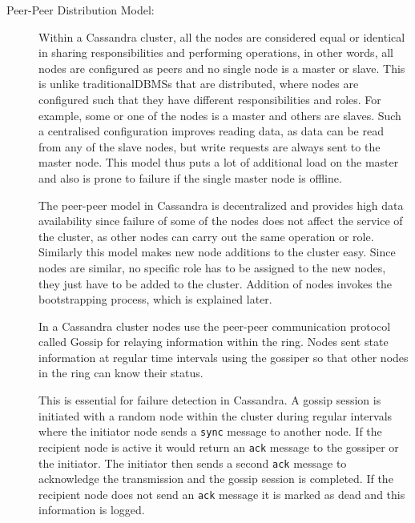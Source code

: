 \begin{description}
\item[Peer-Peer Distribution Model:] Within a Cassandra cluster, all the nodes
are considered equal or identical in sharing responsibilities and
performing operations, in other words, all nodes are configured as peers and no
single node is a master or slave.  This is unlike traditional\acp{DBMS} that
are distributed, where nodes are configured such that they have different
responsibilities and roles. For example, some or one of the nodes is a master
and others are slaves.
Such a centralised configuration improves reading data, as data can be read from
any of the slave nodes, but write requests are always sent to the master node.
This model thus puts a lot of additional load on the master and also is prone to
failure if the single master node is offline.

The peer-peer model in Cassandra is decentralized and  provides high data
availability since failure of some of the nodes does not affect the service of
the cluster, as other nodes can carry out the same operation or role. Similarly
this model makes new node additions to the cluster easy. Since nodes are
similar, no specific role has to be assigned to the new nodes, they just have to
be added to the cluster. Addition of nodes invokes the bootstrapping process,
which is explained later.

In a Cassandra cluster nodes use the peer-peer communication protocol called
Gossip for relaying information within the ring. Nodes sent state information at
regular time intervals using the gossiper so that other nodes in the ring can
know their status.

This is essential for failure detection in Cassandra. A gossip session is
initiated with a random node within the cluster during regular intervals where
the initiator node  sends a \texttt{sync} message to another node. If  the
recipient node is active it would return an \texttt{ack} message to the gossiper
or the initiator. The initiator then sends a second \texttt{ack} message to
acknowledge the transmission and the gossip session is completed. If the
recipient node does not send an \texttt{ack} message it is marked as dead and
this information is logged.


\end{description}
